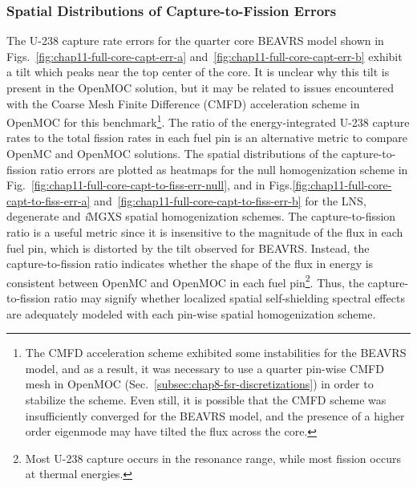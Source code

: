 \clearpage

\subsubsection{Spatial Distributions of Capture-to-Fission Errors}
\label{subsec:chap11-imgxs-capt-to-fiss-errors}

The U-238 capture rate errors for the quarter core \ac{BEAVRS} model shown in Figs.~\ref{fig:chap11-full-core-capt-err-a} and~\ref{fig:chap11-full-core-capt-err-b} exhibit a tilt which peaks near the top center of the core. It is unclear why this tilt is present in the OpenMOC solution, but it may be related to issues encountered with the Coarse Mesh Finite Difference (CMFD) acceleration scheme in OpenMOC for this benchmark\footnote{The \ac{CMFD} acceleration scheme exhibited some instabilities for the \ac{BEAVRS} model, and as a result, it was necessary to use a quarter pin-wise \ac{CMFD} mesh in OpenMOC (Sec.~\ref{subsec:chap8-fsr-discretizations}) in order to stabilize the scheme. Even still, it is possible that the \ac{CMFD} scheme was insufficiently converged for the \ac{BEAVRS} model, and the presence of a higher order eigenmode may have tilted the flux across the core.}. The ratio of the energy-integrated U-238 capture rates to the total fission rates in each fuel pin is an alternative metric to compare OpenMC and OpenMOC solutions. The spatial distributions of the capture-to-fission ratio errors are plotted as heatmaps for the null homogenization scheme in Fig.~\ref{fig:chap11-full-core-capt-to-fiss-err-null}, and in Figs.\ref{fig:chap11-full-core-capt-to-fiss-err-a} and~\ref{fig:chap11-full-core-capt-to-fiss-err-b} for the \ac{LNS}, degenerate and \textit{i}\ac{MGXS} spatial homogenization schemes. The capture-to-fission ratio is a useful metric since it is insensitive to the magnitude of the flux in each fuel pin, which is distorted by the tilt observed for \ac{BEAVRS}. Instead, the capture-to-fission ratio indicates whether the shape of the flux in energy is consistent between OpenMC and OpenMOC in each fuel pin\footnote{Most U-238 capture occurs in the resonance range, while most fission occurs at thermal energies.}. Thus, the capture-to-fission ratio may signify whether localized spatial self-shielding spectral effects are adequately modeled with each pin-wise spatial homogenization scheme.

